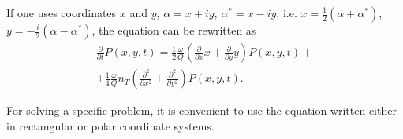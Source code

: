 If one uses coordinates  $x$ and $y$, 
$\alpha = x + i y$, $\alpha^{*} = x - i y$, i.e. 
$x = \frac{1}{2}\left(\alpha + \alpha^{*}\right)$,  
$y = - \frac{i}{2}\left(\alpha - \alpha^{*}\right)$,  the equation can be rewritten as 
\begin{eqnarray}
\frac{\partial}{\partial t}P\left(x, y, t\right) = 
\frac{1}{2}\frac{\omega}{Q}
\left(
\frac{\partial}{\partial x} x +
\frac{\partial}{\partial y} y
\right)
P\left(x, y, t\right) +
\nonumber \\
+
\frac{1}{4}
\frac{\omega}{Q}\bar{n}_T
\left(
\frac{\partial^2}{\partial x^2} +
\frac{\partial^2}{\partial y^2}
\right)
P\left(x, y, t\right).
\label{eqCh2_77a}
\end{eqnarray}

For solving a specific problem, it is convenient to use the equation
written either in rectangular or polar coordinate systems.   
